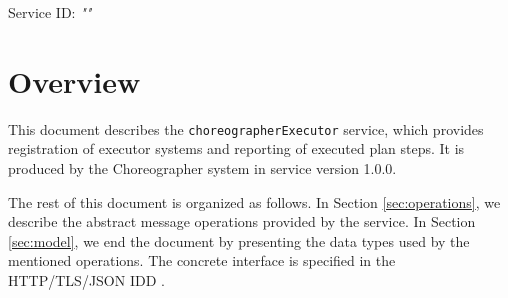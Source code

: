 \documentclass[a4paper]{arrowhead}
\begin{document}
\sloppy

\ArrowheadSetup

\begin{center}
  \vspace*{1cm}
  \huge{\arrowtitle}

  \vspace*{0.2cm}
  \LARGE{\arrowtype}
  \vspace*{1cm}

  \Large{Service ID: \textit{"\arrowid"}}

  \vspace*{\fill}


  \vspace*{1cm}
  \vspace*{\fill}

  \begin{abstract}
    This document describes the \texttt{choreographer\allowbreak{}Executor} service, version 1.0.0, produced by the Choreographer support system of Arrowhead 5.2.2.
  \end{abstract}

  \vspace*{1cm}
\end{center}

\newpage

\tableofcontents
\newpage

\section{Overview}
\label{sec:overview}

This document describes the \texttt{choreographer\allowbreak{}Executor} service, which provides registration of executor systems and reporting of executed plan steps.
It is produced by the Choreographer system \cite{cho-sysd} in service version 1.0.0.

The rest of this document is organized as follows.
In Section \ref{sec:operations}, we describe the abstract message operations provided by the service.
In Section \ref{sec:model}, we end the document by presenting the data types used by the mentioned operations.
The concrete interface is specified in the HTTP/TLS/JSON IDD \cite{cho-choreographerExecutor-http-idd}.
\end{document}
